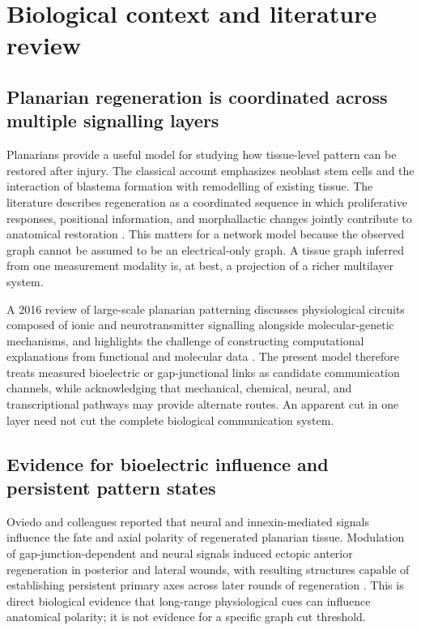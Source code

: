 \documentclass[12pt,a4paper]{article}
\begin{document}
\section{Biological context and literature review}
\subsection{Planarian regeneration is coordinated across multiple signalling layers}
Planarians provide a useful model for studying how tissue-level pattern can be restored after injury. The classical account emphasizes neoblast stem cells and the interaction of blastema formation with remodelling of existing tissue. The literature describes regeneration as a coordinated sequence in which proliferative responses, positional information, and morphallactic changes jointly contribute to anatomical restoration \citep{Reddien2004}. This matters for a network model because the observed graph cannot be assumed to be an electrical-only graph. A tissue graph inferred from one measurement modality is, at best, a projection of a richer multilayer system.

A 2016 review of large-scale planarian patterning discusses physiological circuits composed of ionic and neurotransmitter signalling alongside molecular-genetic mechanisms, and highlights the challenge of constructing computational explanations from functional and molecular data \citep{Levin2016Patterning}. The present model therefore treats measured bioelectric or gap-junctional links as candidate communication channels, while acknowledging that mechanical, chemical, neural, and transcriptional pathways may provide alternate routes. An apparent cut in one layer need not cut the complete biological communication system.

\subsection{Evidence for bioelectric influence and persistent pattern states}
Oviedo and colleagues reported that neural and innexin-mediated signals influence the fate and axial polarity of regenerated planarian tissue. Modulation of gap-junction-dependent and neural signals induced ectopic anterior regeneration in posterior and lateral wounds, with resulting structures capable of establishing persistent primary axes across later rounds of regeneration \citep{Oviedo2010}. This is direct biological evidence that long-range physiological cues can influence anatomical polarity; it is not evidence for a specific graph cut threshold.
\end{document}
